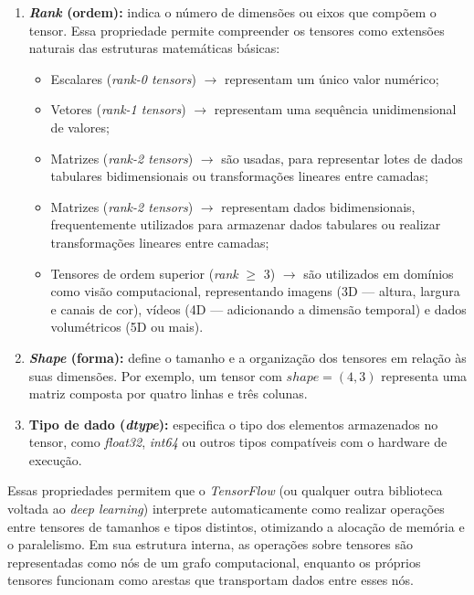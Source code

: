 \begin{enumerate}

    \item \textbf{\textit{Rank} (ordem):} indica o número de dimensões ou eixos que compõem o tensor. Essa propriedade permite compreender os tensores como extensões naturais das estruturas matemáticas básicas:


    \begin{itemize}

        \item Escalares (\textit{rank-0 tensors}) $\rightarrow$ representam um único valor numérico;

        \item Vetores (\textit{rank-1 tensors}) $\rightarrow$ representam uma sequência unidimensional de valores;
    
        \item Matrizes (\textit{rank-2 tensors}) $\rightarrow$ são usadas, para representar lotes de dados tabulares bidimensionais ou transformações lineares entre camadas;

        \item Matrizes (\textit{rank-2 tensors}) $\rightarrow$ representam dados bidimensionais, frequentemente utilizados para armazenar dados tabulares ou realizar transformações lineares entre camadas;

        \item Tensores de ordem superior (\textit{rank} $\geq$ 3) $\rightarrow$ são utilizados em domínios como visão computacional, representando imagens (3D — altura, largura e canais de cor), vídeos (4D — adicionando a dimensão temporal) e dados volumétricos (5D ou mais).

    \end{itemize}

    \item \textbf{\textit{Shape} (forma):} define o tamanho e a organização dos tensores em relação às suas dimensões. Por exemplo, um tensor com $shape = (4, 3)$ representa uma matriz composta por quatro linhas e três colunas.

    \item \textbf{Tipo de dado (\textit{dtype}):} especifica o tipo dos elementos armazenados no tensor, como \textit{float32}, \textit{int64} ou outros tipos compatíveis com o hardware de execução.

\end{enumerate}

Essas propriedades permitem que o \textit{TensorFlow} (ou qualquer outra biblioteca voltada ao \textit{deep learning}) interprete automaticamente como realizar operações entre tensores de tamanhos e tipos distintos, otimizando a alocação de memória e o paralelismo. Em sua estrutura interna, as operações sobre tensores são representadas como nós de um grafo computacional, enquanto os próprios tensores funcionam como arestas que transportam dados entre esses nós. 

